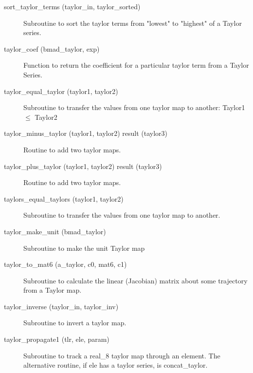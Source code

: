 \begin{description}
\label{r:sort.taylor.terms}
\item[sort_taylor_terms (taylor_in, taylor_sorted)] \Newline
Subroutine to sort the taylor terms from "lowest" to "highest" of a
Taylor series.

\label{r:taylor.coef}
\item[taylor_coef (bmad_taylor, exp)] \Newline 
Function to return the coefficient for a particular taylor term from a
Taylor Series.

\label{r:taylor.equal.taylor}
\item[taylor_equal_taylor (taylor1, taylor2)] \Newline
Subroutine to transfer the values from one taylor map to another:
Taylor1 $\le$ Taylor2

\label{r:taylor.minus.taylor}
\item[taylor_minus_taylor (taylor1, taylor2) result (taylor3)] \Newline 
Routine to add two taylor maps.

\label{r:taylor.plus.taylor}
\item[taylor_plus_taylor (taylor1, taylor2) result (taylor3)] \Newline 
Routine to add two taylor maps.

\label{r:taylors.equal.taylors}
\item[taylors_equal_taylors (taylor1, taylor2)] \Newline 
Subroutine to transfer the values from one taylor map to another.

\label{r:taylor.make.unit}
\item[taylor_make_unit (bmad_taylor)] \Newline
Subroutine to make the unit Taylor map

\label{r:taylor.to.mat6}
\item[taylor_to_mat6 (a_taylor, c0, mat6, c1)] \Newline
Subroutine to calculate the linear (Jacobian) matrix about some
trajectory from a Taylor map.

\label{r:taylor.inverse}
\item[taylor_inverse (taylor_in, taylor_inv)] \Newline
Subroutine to invert a taylor map. 

\label{r:taylor.propagate1}
\item[taylor_propagate1 (tlr, ele, param)] \Newline
Subroutine to track a real_8 taylor map through an element. 
The alternative routine, if ele has a taylor series, is concat_taylor. 


\end{description}
